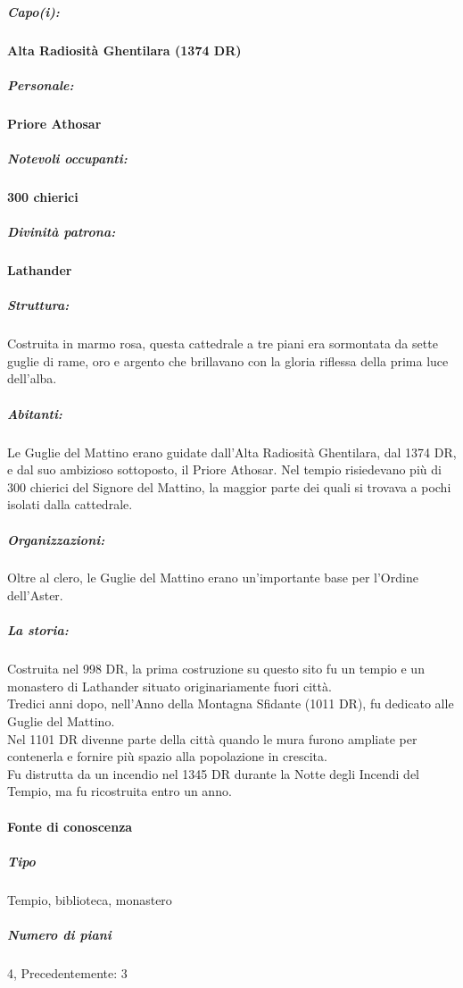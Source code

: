 \documentclass{article}
\begin{document}
              \subparagraph{Capo(i):}
              \textbf{Alta Radiosità Ghentilara (1374 DR)}
              
              \subparagraph{Personale:}
              \textbf{Priore Athosar}
              
              \subparagraph{Notevoli occupanti:}
              \textbf{300 chierici}
              
              \subparagraph{Divinità patrona:}
              \textbf{Lathander}
              
              \subparagraph{Struttura:}
              Costruita in marmo rosa, questa cattedrale a tre piani era sormontata da sette guglie di rame, oro e argento che brillavano con la gloria riflessa della prima luce dell'alba.
              
              \subparagraph{Abitanti:}
              Le Guglie del Mattino erano guidate dall'Alta Radiosità Ghentilara, dal 1374 DR, e dal suo ambizioso sottoposto, il Priore Athosar. Nel tempio risiedevano più di 300 chierici del Signore del Mattino, la maggior parte dei quali si trovava a pochi isolati dalla cattedrale.
              
              \subparagraph{Organizzazioni:}
              Oltre al clero, le Guglie del Mattino erano un'importante base per l'Ordine dell'Aster.
              
              \subparagraph{La storia:}
              Costruita nel 998 DR, la prima costruzione su questo sito fu un tempio e un monastero di Lathander situato originariamente fuori città.\\
              Tredici anni dopo, nell'Anno della Montagna Sfidante (1011 DR), fu dedicato alle Guglie del Mattino.\\
              Nel 1101 DR divenne parte della città quando le mura furono ampliate per contenerla e fornire più spazio alla popolazione in crescita.\\
              Fu distrutta da un incendio nel 1345 DR durante la Notte degli Incendi del Tempio, ma fu ricostruita entro un anno.
              
      \paragraph{Fonte di conoscenza}

              \subparagraph{Tipo}
              Tempio, biblioteca, monastero
              
              \subparagraph{Numero di piani}
              4, Precedentemente: 3
              
\end{document}
